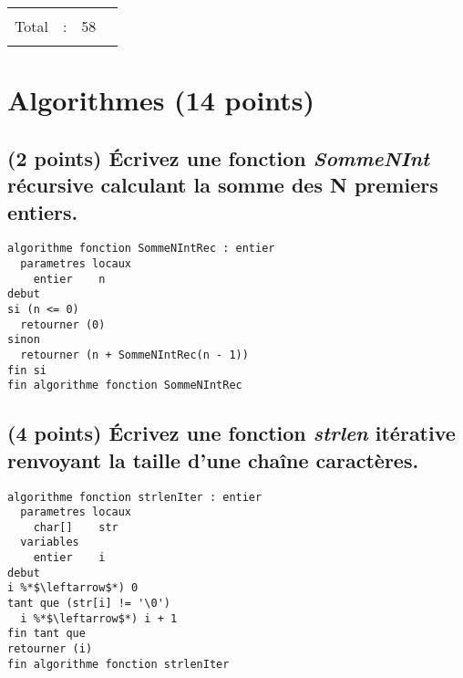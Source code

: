 \documentclass[11pt,a4paper]{article}
\begin{document}
\begin{table}[h!]
\begin{minipage}{0.4\textwidth}
\begin{tabular}{| C{1cm} | C{1cm} | C{1cm} | C{1cm} |}
             &     &     &       \\
        \hline
             &     &     &       \\
       Total &  :  & 58  &       \\
             &     &     &       \\
        \hline
    \end{tabular}
  \end{minipage}
\end{table}


\vfillLast
\newpage

\section{Algorithmes (14 points)}

\subsection{(2 points) \'Ecrivez une fonction \og \textit{SommeNInt} \fg{} récursive calculant la somme des N premiers entiers. }

\bigskip

\begin{center}

\begin{lstlisting}[style=algorithmique]
algorithme fonction SommeNIntRec : entier
  parametres locaux
    entier    n
debut
si (n <= 0)
  retourner (0)
sinon
  retourner (n + SommeNIntRec(n - 1))
fin si
fin algorithme fonction SommeNIntRec \end{lstlisting}

\end{center}

\smallskip


\subsection{(4 points) \'Ecrivez une fonction \og \textit{strlen} \fg{} itérative renvoyant la taille d'une chaîne caractères. }

\bigskip

\begin{center}

\begin{lstlisting}[style=algorithmique]
algorithme fonction strlenIter : entier
  parametres locaux
    char[]    str
  variables
    entier    i
debut
i %*$\leftarrow$*) 0
tant que (str[i] != '\0')
  i %*$\leftarrow$*) i + 1
fin tant que
retourner (i)
fin algorithme fonction strlenIter \end{lstlisting}

\end{center}
\end{document}
